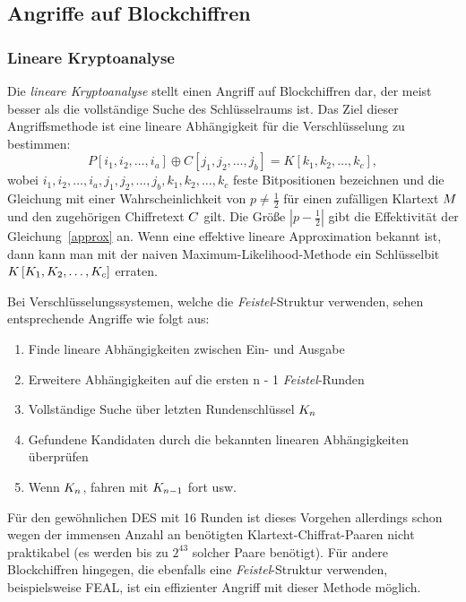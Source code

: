 \subsection{Angriffe auf Blockchiffren}

\subsubsection{Lineare Kryptoanalyse}
\label{sssec:linKryptoanalyse}
Die \textit{lineare Kryptoanalyse} stellt einen Angriff auf Blockchiffren dar, der meist besser als die vollständige Suche des Schlüsselraums ist. Das Ziel dieser Angriffsmethode ist eine lineare Abhängigkeit für die Verschlüsselung zu bestimmen:
\begin{equation}
	P \left[ i_1, i_2, \ldots, i_a \right] \oplus C \left[ j_1, j_2, \ldots, j_b \right]  = K \left[ k_1, k_2, \ldots, k_c \right], \label{approx}
\end{equation}
wobei  $i_1, i_2, \ldots, i_a, j_1, j_2, \ldots, j_b,k_1, k_2, \ldots, k_c$ feste Bitpositionen bezeichnen und die Gleichung mit einer Wahrscheinlichkeit von
$p\neq \frac{1}{2}$ für einen zufälligen Klartext $M$ und den zugehörigen Chiffretext $C$ gilt. Die Größe $\left|{p-\frac{1}{2}}\right|$ gibt die
Effektivität der Gleichung~\ref{approx} an. Wenn eine effektive lineare Approximation bekannt ist, dann kann man mit der naiven Maximum-Likelihood-Methode ein
Schlüsselbit $K \left[ K_1, K_2, \ldots, K_c \right]$ erraten.

Bei Verschlüsselungssystemen, welche die \textit{Feistel}-Struktur verwenden, sehen entsprechende Angriffe wie folgt aus:
\begin{enumerate}
	\item Finde lineare Abhängigkeiten zwischen Ein- und Ausgabe
	\item Erweitere Abhängigkeiten auf die ersten n - 1 \textit{Feistel}-Runden
	\item Vollständige Suche über letzten Rundenschlüssel $K_n$
	\item Gefundene Kandidaten durch die bekannten linearen Abhängigkeiten überprüfen
	\item Wenn $K_n$, fahren mit $K_{n-1}$ fort usw.
\end{enumerate}

Für den gewöhnlichen DES mit 16 Runden ist dieses Vorgehen allerdings schon wegen der immensen Anzahl an benötigten Klartext-Chiffrat-Paaren nicht praktikabel (es werden bis zu $2^{43}$ solcher Paare benötigt). Für andere Blockchiffren hingegen, die ebenfalls eine \textit{Feistel}-Struktur verwenden, beispielsweise FEAL, ist ein effizienter Angriff mit dieser Methode möglich.


